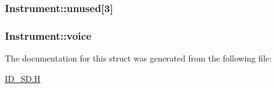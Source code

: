 \label{structInstrument_a40e28df7a44faa1e42a800cd50ff52ab}
\hypertarget{structInstrument_a40bcda7399dcc7bb80e4a543c80680d9}{
\subsubsection[{unused}]{ {\bf Instrument::unused}\mbox{[}3\mbox{]}}}
\label{structInstrument_a40bcda7399dcc7bb80e4a543c80680d9}
\hypertarget{structInstrument_a47a6c9bb66ac68faf34e32a9f08de94b}{
\subsubsection[{voice}]{ {\bf Instrument::voice}}}
\label{structInstrument_a47a6c9bb66ac68faf34e32a9f08de94b}


The documentation for this struct was generated from the following file:\begin{DoxyCompactItemize}
\item 
\hyperlink{ID__SD_8H}{ID\_\-SD.H}\end{DoxyCompactItemize}
